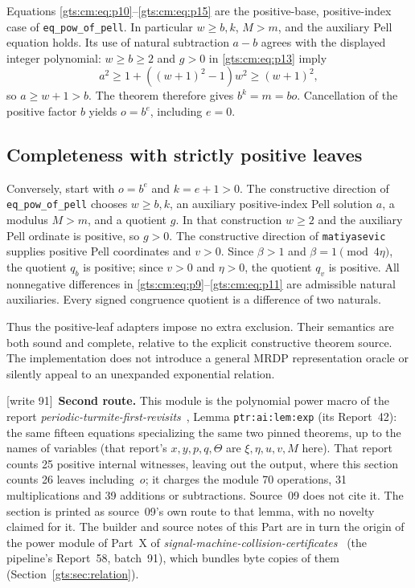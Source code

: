 \documentclass[11pt,letterpaper]{article}
\theoremstyle{definition}
\theoremstyle{remark}
\newcommand{\wtagd}{\textup{[write 91]}}
\begin{document}
Equations \eqref{gts:cm:eq:p10}--\eqref{gts:cm:eq:p15} are the positive-base, positive-index case of \texttt{eq\_pow\_of\_pell}. In particular $w\ge b,k$, $M>m$, and the auxiliary Pell equation holds. Its use of natural subtraction $a-b$ agrees with the displayed integer polynomial: $w\ge b\ge2$ and $g>0$ in \eqref{gts:cm:eq:p13} imply
\[
 a^2\ge1+((w+1)^2-1)w^2\ge(w+1)^2,
\]
so $a\ge w+1>b$. The theorem therefore gives $b^k=m=bo$. Cancellation of the positive factor $b$ yields $o=b^e$, including $e=0$.

\subsection{Completeness with strictly positive leaves}
Conversely, start with $o=b^e$ and $k=e+1>0$. The constructive direction of \texttt{eq\_pow\_of\_pell} chooses $w\ge b,k$, an auxiliary positive-index Pell solution $a$, a modulus $M>m$, and a quotient $g$. In that construction $w\ge2$ and the auxiliary Pell ordinate is positive, so $g>0$. The constructive direction of \texttt{matiyasevic} supplies positive Pell coordinates and $v>0$. Since $\beta>1$ and $\beta=1\pmod{4\eta}$, the quotient $q_b$ is positive; since $v>0$ and $\eta>0$, the quotient $q_v$ is positive. All nonnegative differences in \eqref{gts:cm:eq:p9}--\eqref{gts:cm:eq:p11} are admissible natural auxiliaries. Every signed congruence quotient is a difference of two naturals.

Thus the positive-leaf adapters impose no extra exclusion. Their semantics are both sound and complete, relative to the explicit constructive theorem source. The implementation does not introduce a general MRDP representation oracle or silently appeal to an unexpanded exponential relation.

\wtagd\ \textbf{Second route.} This module is the polynomial power macro of the report \emph{periodic-turmite-first-revisits}~\cite{ptr}, Lemma \texttt{ptr:ai:lem:exp} (its Report~42): the same fifteen equations specializing the same two pinned theorems, up to the names of variables (that report's $x,y,p,q,\Theta$ are $\xi,\eta,u,v,M$ here). That report counts 25 positive internal witnesses, leaving out the output, where this section counts 26 leaves including~$o$; it charges the module 70 operations, 31 multiplications and 39 additions or subtractions. Source~09 does not cite it. The section is printed as source~09's own route to that lemma, with no novelty claimed for it. The builder and source notes of this Part are in turn the origin of the power module of Part~X of \emph{signal-machine-collision-certificates}~\cite{smc} (the pipeline's Report~58, batch~91), which bundles byte copies of them (Section~\ref{gts:sec:relation}).
\end{document}
